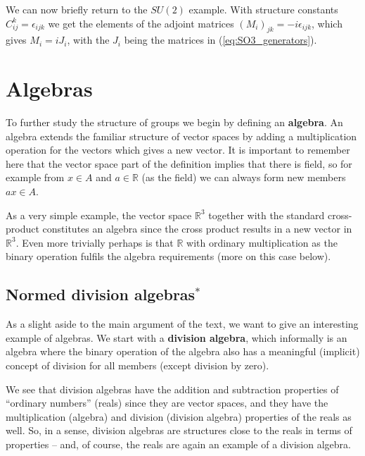 \documentclass[notes.tex]{subfiles}
\begin{document}
We can now briefly return to the $SU(2)$ example. With structure constants $C^k_{ij}=\epsilon_{ijk}$ we get the elements of the adjoint matrices $(M_i)_{jk} =-i\epsilon_{ijk}$, which gives $M_i=iJ_i$, with the $J_i$ being the matrices in (\ref{eq:SO3_generators}). 


\section{Algebras}
\label{sec:algebras}

To further study the structure of groups we begin by defining an {\bf algebra}. An algebra extends the familiar structure of vector spaces by adding a multiplication operation for the vectors which gives a new vector.
It is important to remember here that the vector space part of the definition implies that there is field, so for example from $x\in A$ and $a\in \mathbb{R}$ (as the field) we can always form new members $ax\in A$.

As a very simple example, the vector space $\mathbb{R}^3$ together with the standard cross-product constitutes an algebra since the cross product results in a new vector in  $\mathbb{R}^3$. Even more trivially perhaps is that $\mathbb{R}$ with ordinary multiplication as the binary operation fulfils the algebra requirements (more on this case below).

\subsection{Normed division algebras$^*$}
As a slight aside to the main argument of the text, we want to give an interesting example of algebras. We start with a {\bf division algebra}, which informally is an algebra where the binary operation of the algebra also has a meaningful (implicit) concept of division for all members (except division by zero).

We see that division algebras have the addition and subtraction properties of ``ordinary numbers'' (reals) since they are vector spaces, and they have the  multiplication (algebra) and division (division algebra) properties of the reals as well. So, in a sense, division algebras are structures close to the reals in terms of properties -- and, of course, the reals are again an example of a division algebra. 
\end{document}
